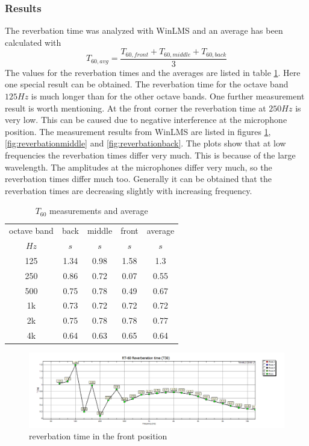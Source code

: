 \documentclass{article}
\begin{document}
\subsubsection{Results}
The reverbation time was analyzed with WinLMS and an average has been calculated with
$$T_{60,avg}=\frac{T_{60,front}+T_{60,middle}+T_{60,back}}{3}$$
The values for the reverbation times and the averages are listed in table \ref{tab:Tmeasurements}. Here one special result can be obtained. The reverbation time for the octave band $125Hz$ is much longer than for the other octave bands. One further measurement result is worth mentioning. At the front corner the reverbation time at $250Hz$ is very low. This can be caused due to negative interference at the microphone position. The measurement results from WinLMS are listed in figures \ref{fig:reverbationfront}, \ref{fig:reverbationmiddle} and \ref{fig:reverbationback}. The plots show that at low frequencies the reverbation times differ very much. This is because of the large wavelength. The amplitudes at the microphones differ very much, so the reverbation times differ much too. Generally it can be obtained that the reverbation times are decreasing slightly with increasing frequency.
\begin{table}
\begin{center}
\begin{tabular}{|c||c|c|c||c|}
\hline
octave band & back & middle & front & average	\\
$Hz$		&	$s$	&	$s$		&	$s$		&	$s$		\\
\hline
\hline
125			& 1.34	&	0.98	&	1.58	&	1.3		\\
\hline
250			& 0.86	&	0.72	&	0.07	&	0.55	\\
\hline
500			& 0.75	& 	0.78	&	0.49	&	0.67	\\
\hline
1k			& 0.73	&	0.72	&	0.72	&	0.72	\\
\hline
2k			& 0.75	&	0.78	&	0.78	&	0.77	\\
\hline
4k			& 0.64	&	0.63	&	0.65	& 	0.64	\\
\hline
\end{tabular}
\caption{$T_{60}$ measurements and average}
\label{tab:Tmeasurements}
\end{center}
\end{table}
\begin{figure}[htbp]
\begin{center}
\includegraphics[width=15cm,keepaspectratio=true]{reverbationfront}
\caption{reverbation time in the front position}
\label{fig:reverbationfront}
\end{center}
\end{figure}
\end{document}
